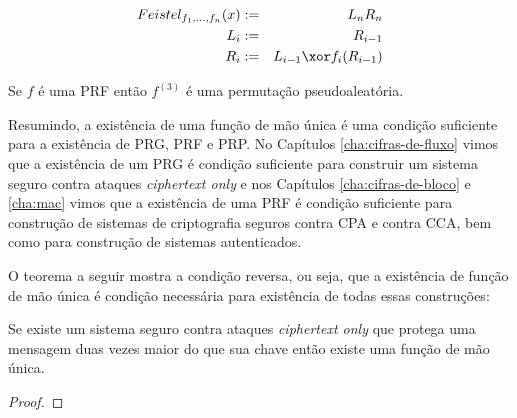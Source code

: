 \begin{eqnarray*}
  Feistel_{f_1,\dots,f_n}(x) & := & L_nR_n\\
  L_i & := & R_{i-1}\\
  R_i & := & L_{i-1} \xor f_i(R_{i-1})
\end{eqnarray*}


\begin{theorem}
  Se $f$ é uma PRF então $f^{(3)}$ é uma permutação pseudoaleatória.
\end{theorem}


Resumindo, a existência de uma função de mão única é uma condição suficiente para a existência de PRG, PRF e PRP.
No Capítulos \ref{cha:cifras-de-fluxo} vimos que a existência de um PRG é condição suficiente para construir um sistema seguro contra ataques {\em ciphertext only} e nos Capítulos \ref{cha:cifras-de-bloco} e \ref{cha:mac} vimos que a existência de uma PRF é condição suficiente para construção de sistemas de criptografia seguros contra CPA e contra CCA, bem como para construção de sistemas autenticados.

O teorema a seguir mostra a condição reversa, ou seja, que a existência de função de mão única é condição necessária para existência de todas essas construções:


\begin{theorem}
  Se existe um sistema seguro contra ataques {\em ciphertext only} que protega uma mensagem duas vezes maior do que sua chave então existe uma função de mão única.
\end{theorem}

\begin{proof}
\end{proof}

